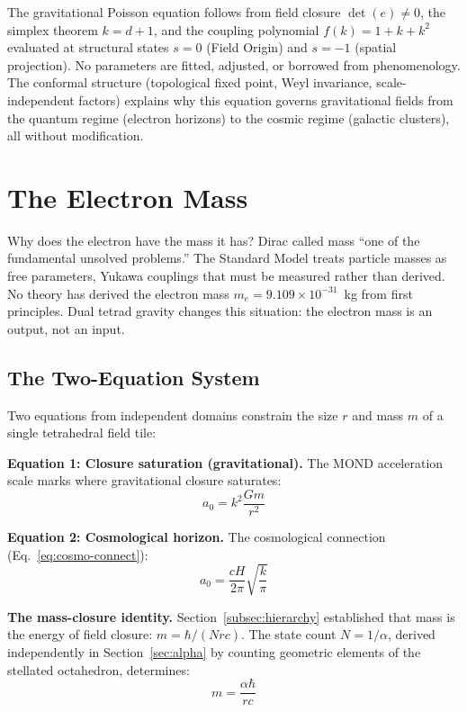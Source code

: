 \documentclass[aps,prd,preprint,superscriptaddress,showpacs,preprintnumbers,amsmath,amssymb,nofootinbib]{revtex4-2}
\begin{document}
The gravitational Poisson equation follows from field closure $\det(e) \neq 0$, the simplex theorem $k = d+1$, and the coupling polynomial $f(k) = 1 + k + k^2$ evaluated at structural states $s=0$ (Field Origin) and $s=-1$ (spatial projection). No parameters are fitted, adjusted, or borrowed from phenomenology. The conformal structure (topological fixed point, Weyl invariance, scale-independent factors) explains why this equation governs gravitational fields from the quantum regime (electron horizons) to the cosmic regime (galactic clusters), all without modification.

\section{The Electron Mass}
\label{sec:electron-mass}

Why does the electron have the mass it has? Dirac called mass ``one of the fundamental unsolved problems.'' The Standard Model treats particle masses as free parameters, Yukawa couplings that must be measured rather than derived. No theory has derived the electron mass $m_e = 9.109 \times 10^{-31}$~kg from first principles. Dual tetrad gravity changes this situation: the electron mass is an output, not an input.

\subsection{The Two-Equation System}
\label{subsec:two-eq}

Two equations from independent domains constrain the size $r$ and mass $m$ of a single tetrahedral field tile:

\textbf{Equation 1: Closure saturation (gravitational).} The MOND acceleration scale marks where gravitational closure saturates:
\begin{equation}
a_0 = k^2 \frac{Gm}{r^2}
\label{eq:closure-sat}
\end{equation}

\textbf{Equation 2: Cosmological horizon.} The cosmological connection (Eq.~\ref{eq:cosmo-connect}):
\begin{equation}
a_0 = \frac{cH}{2\pi} \sqrt{\frac{k}{\pi}}
\end{equation}

\textbf{The mass-closure identity.} Section~\ref{subsec:hierarchy} established that mass is the energy of field closure: $m = \hbar/(Nrc)$. The state count $N = 1/\alpha$, derived independently in Section~\ref{sec:alpha} by counting geometric elements of the stellated octahedron, determines:
\begin{equation}
m = \frac{\alpha \hbar}{rc}
\label{eq:quantum-em}
\end{equation}
\end{document}
